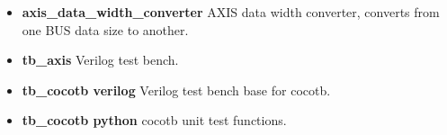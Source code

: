\begin{itemize}
\item \textbf{axis\_data\_width\_converter} AXIS data width converter, converts from one BUS data size to another.\\
\item \textbf{tb\_axis} Verilog test bench.\\
\item \textbf{tb\_cocotb verilog} Verilog test bench base for cocotb.\\
\item \textbf{tb\_cocotb python} cocotb unit test functions.\\
\end{itemize}

